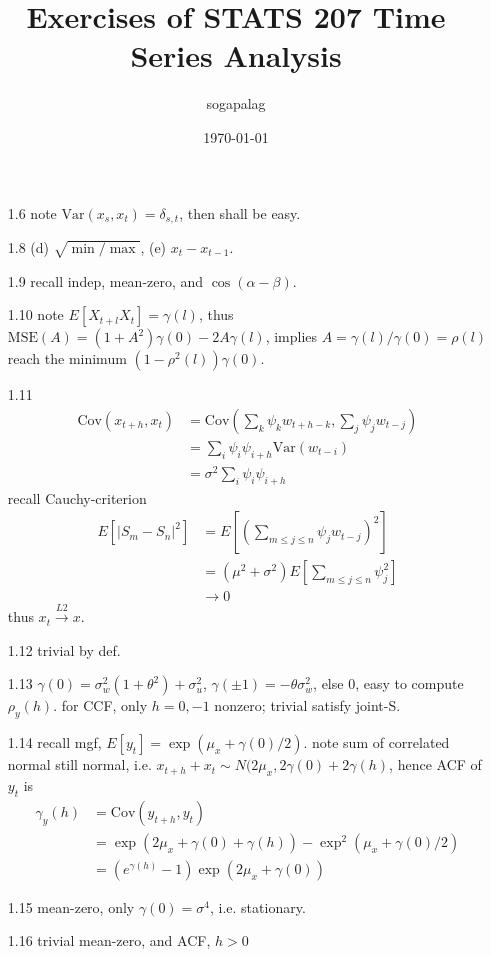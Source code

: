 \documentclass[paper=a4, fontsize=11pt]{scrartcl} %
\title{Exercises of STATS 207 Time Series Analysis}
\author{sogapalag}
\date{\normalsize\today}
\numberwithin{equation}{section} %
\numberwithin{figure}{section} %
\numberwithin{table}{section} %
\def \cov {\text{Cov}}
\def \var {\text{Var}}
\begin{document}
\maketitle
\begin{itemize}
	\item[1.6] note $\var(x_s,x_t)=\delta_{s,t}$, then shall be easy.
	\item[1.8] (d) $\sqrt{\min/\max}$, (e) $x_t-x_{t-1}$.
	\item[1.9] recall indep, mean-zero, and $\cos(\alpha-\beta)$.
	\item[1.10] note $E[X_{t+l}X_t]=\gamma(l)$, thus $\text{MSE}(A)=(1+A^2)\gamma(0)-2A\gamma(l)$, implies $A=\gamma(l)/\gamma(0)=\rho(l)$ reach the minimum $(1-\rho^2(l))\gamma(0)$.
	\item[1.11]
	\begin{align}
		\cov(x_{t+h}, x_t) &= \cov(\sum_k \psi_k w_{t+h-k}, \sum_j\psi_j w_{t-j})\\
			&= \sum_i\psi_i\psi_{i+h}\var( w_{t-i})\\
			&= \sigma^2\sum_i\psi_i\psi_{i+h}
	\end{align}
	recall Cauchy-criterion
	\begin{align}
		E[|S_m-S_n|^2] &= E[(\sum_{m\leq j\leq n}\psi_jw_{t-j})^2]\\
			&= (\mu^2+\sigma^2)E[\sum_{m\leq j\leq n}\psi_j^2]\\
			&\rightarrow 0
	\end{align}
	thus $x_t\stackrel{L2}{\rightarrow} x$.
	\item[1.12] trivial by def.
	\item[1.13] $\gamma(0)=\sigma_w^2(1+\theta^2)+\sigma_u^2$, $\gamma(\pm 1)=-\theta \sigma_w^2$, else $0$, easy to compute $\rho_y(h)$. for CCF, only $h=0,-1$ nonzero; trivial satisfy joint-S.
	\item[1.14] recall mgf, $E[y_t]=\exp(\mu_x+\gamma(0)/2)$. note sum of correlated normal still normal, i.e. $x_{t+h}+x_t \sim N(2\mu_x, 2\gamma(0)+2\gamma(h)$, hence ACF of $y_t$ is
	\begin{align}
		\gamma_y(h) &= \cov(y_{t+h},y_t)\\
			&= \exp(2\mu_x + \gamma(0)+\gamma(h)) - \exp^2(\mu_x+\gamma(0)/2)\\
			&= (e^{\gamma(h)}-1)\exp(2\mu_x + \gamma(0))
	\end{align}
	\item[1.15] mean-zero, only $\gamma(0)=\sigma^4$, i.e. stationary.
	\item[1.16] trivial mean-zero, and ACF, $h>0$

\end{itemize}
\end{document}
